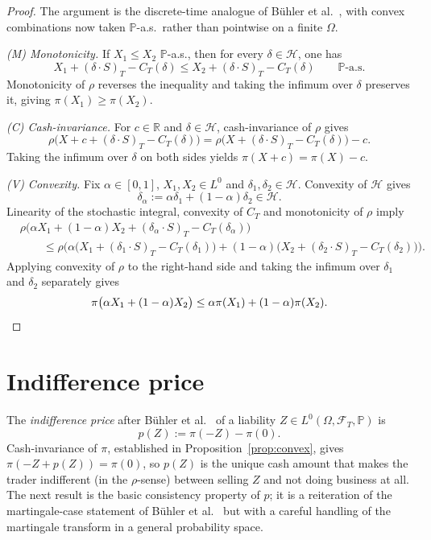 \documentclass[11pt,a4paper]{report}
\numberwithin{equation}{chapter}
\theoremstyle{plain}
\theoremstyle{definition}
\newcommand{\PP}{\mathbb{P}}
\newcommand{\R}{\mathbb{R}}
\newcommand{\F}{\mathcal{F}}
\newcommand{\HH}{\mathcal{H}}
\begin{document}
\begin{proof}
    The argument is the discrete-time analogue of B\"uhler et al.\ \cite[Proposition~3.1]{buehler}, with convex combinations now taken $\PP$-a.s.\ rather than pointwise on a finite $\Omega$.

    \emph{(M) Monotonicity.} If $X_1\le X_2$ $\PP$-a.s., then for every $\delta\in\HH$, one has
    \[
        X_1+(\delta\cdot S)_T-C_T(\delta)\le X_2+(\delta\cdot S)_T-C_T(\delta)\qquad\PP\text{-a.s.}
    \]
    Monotonicity of $\rho$ reverses the inequality and taking the infimum over $\delta$ preserves it, giving $\pi(X_1)\ge\pi(X_2)$.

    \emph{(C) Cash-invariance.} For $c\in\R$ and $\delta\in\HH$, cash-invariance of $\rho$ gives
    \[
        \rho\bigl(X+c+(\delta\cdot S)_T-C_T(\delta)\bigr)=\rho\bigl(X+(\delta\cdot S)_T-C_T(\delta)\bigr)-c.
    \]
    Taking the infimum over $\delta$ on both sides yields $\pi(X+c)=\pi(X)-c$.

    \emph{(V) Convexity.} Fix $\alpha\in[0,1]$, $X_1,X_2\in L^0$ and $\delta_1,\delta_2\in\HH$. Convexity of $\HH$ gives
    \[
        \delta_\alpha:=\alpha\delta_1+(1-\alpha)\delta_2\in\HH.
    \]
    Linearity of the stochastic integral, convexity of $C_T$ and monotonicity of $\rho$ imply
    \begin{align*}
         & \rho\Big(\alpha X_1+(1-\alpha)X_2+(\delta_\alpha\cdot S)_T-C_T(\delta_\alpha)\Big)                                                          \\
         & \qquad\le\rho\Big(\alpha\bigl(X_1+(\delta_1\cdot S)_T-C_T(\delta_1)\bigr)+(1-\alpha)\bigl(X_2+(\delta_2\cdot S)_T-C_T(\delta_2)\bigr)\Big).
    \end{align*}
    Applying convexity of $\rho$ to the right-hand side and taking the infimum over $\delta_1$ and $\delta_2$ separately gives
    \[
        \pi\bigl(\alpha X_1+(1-\alpha)X_2\bigr)\le\alpha\pi(X_1)+(1-\alpha)\pi(X_2).\qedhere
    \]
\end{proof}

\section{Indifference price}

The \emph{indifference price} after B\"uhler et al.\ \cite{buehler} of a liability $Z\in L^0(\Omega,\F_T,\PP)$ is
\[
    p(Z):=\pi(-Z)-\pi(0).
\]
Cash-invariance of $\pi$, established in Proposition~\ref{prop:convex}, gives $\pi(-Z+p(Z))=\pi(0)$, so $p(Z)$ is the unique cash amount that makes the trader indifferent (in the $\rho$-sense) between selling $Z$ and not doing business at all. The next result is the basic consistency property of $p$; it is a reiteration of the martingale-case statement of B\"uhler et al.\ \cite[Proposition~3.6]{buehler} but with a careful handling of the martingale transform in a general probability space.
\end{document}
